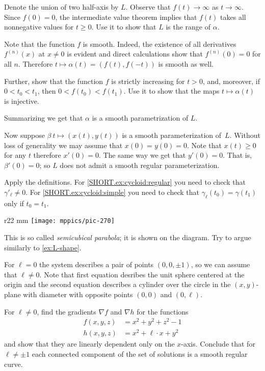 Denote the union of two half-axis by $L$.
Observe that $f(t)\to\infty$ as $t\to \infty$.
Since $f(0)=0$, the intermediate value theorem implies that $f(t)$ takes all nonnegative values for $t\ge 0$.
Use it to show that $L$ is the range of $\alpha$.

Note that the function $f$
is smooth.
Indeed, the existence of all derivatives $f^{(n)}(x)$ at $x\ne 0$ is evident and direct calculations show that $f^{(n)}(0)=0$ for all $n$.
Therefore $t\mapsto \alpha(t)=(f(t),f(-t))$ is smooth as well.

Further, show that the function $f$ is strictly increasing for $t> 0$,
and, moreover, if $0<t_0<t_1$, then $0<f(t_0)<f(t_1)$.
Use it to show that the maps $t\mapsto \alpha(t)$ is injective.

Summarizing we get that $\alpha$ is a smooth parametrization of $L$. 

Now suppose $\beta\:t\mapsto (x(t),y(t))$ is a smooth parameterization of~$L$.
Without loss of generality we may assume that $x(0)=y(0)=0$.
Note that $x(t)\ge 0$ for any $t$ therefore $x'(0)=0$.
The same way we get that $y'(0)=0$.
That is, $\beta'(0)=0$;
so $L$ does not admit a smooth regular parameterization.

Apply the definitions.
For \ref{SHORT.ex:cycloid:regular} you need to check that $\gamma'_\ell\ne 0$.
For \ref{SHORT.ex:cycloid:simple} you need to check that $\gamma_\ell(t_0)=\gamma(t_1)$ only if $t_0=t_1$.

\begin{wrapfigure}{r}{22 mm}
\vskip-0mm
\centering
\texttt{[image: mppics/pic-270]}
\vskip0mm
\end{wrapfigure}

This is so called \emph{semicubical parabola}; it is shown on the diagram.
Try to argue similarly to \ref{ex:L-shape}.


For $\ell=0$ the system describes a pair of points $(0,0,\pm1)$, so we can assume that $\ell\ne 0$.
Note that first equation desribes the unit sphere centered at the origin
and the second equation describes a cylinder over the circle in the $(x,y)$-plane with diameter with opposite points $(0,0)$ and $(0,\ell)$.


For $\ell\ne 0$,
find the gradients $\nabla f$ and $\nabla h$ for the functions
\begin{align*}
 f(x,y,z)&=x^2+y^2+z^2-1
 \\
 h(x,y,z)&=x^2+\ell\cdot x+y^2
\end{align*}
and show that they are linearly dependent only on the $x$-axis.
Conclude that for $\ell\ne\pm 1$ each connected component of the set of solutions is a smooth regular curve.

